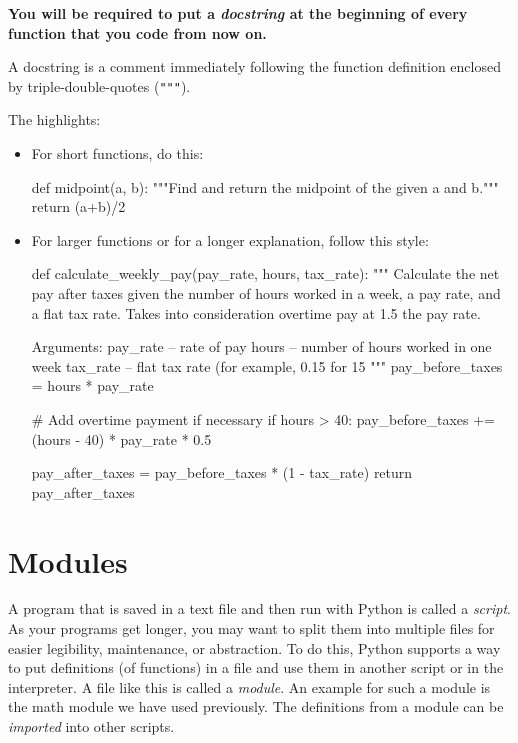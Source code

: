 \documentclass[11pt]{cselabheader}
\begin{document}
{\begin{center}
\bfseries \large You will be required to put a \emph{docstring} at the beginning
of every function that you code from now on.
\end{center}
A docstring is a comment immediately
following the function definition enclosed by triple-double-quotes (\texttt{"""}).

The highlights:
\begin{itemize}
  \item For short functions, do this:

    \begin{python3code}
def midpoint(a, b):
    """Find and return the midpoint of the given a and b."""
    return (a+b)/2
    \end{python3code}

  \item For larger functions or for a longer explanation, follow this style:

    \begin{python3code}
def calculate_weekly_pay(pay_rate, hours, tax_rate):
    """
    Calculate the net pay after taxes given the number of hours worked 
    in a week, a pay rate, and a flat tax rate.
    Takes into consideration overtime pay at 1.5 the pay rate.

    Arguments:
    pay_rate -- rate of pay
    hours -- number of hours worked in one week
    tax_rate -- flat tax rate (for example, 0.15 for 15%
    """
    pay_before_taxes = hours * pay_rate

    # Add overtime payment if necessary
    if hours > 40:
        pay_before_taxes += (hours - 40) * pay_rate * 0.5

    pay_after_taxes = pay_before_taxes * (1 - tax_rate)
    return pay_after_taxes
    \end{python3code}

\end{itemize}

\pagebreak
\section{Modules}
\label{sec:modules}

A program that is saved in a text file and then run with Python is called a
\emph{script}. As your programs get longer, you may want to split them into
multiple files for easier legibility, maintenance, or abstraction. To do this,
Python supports a way to put definitions (of functions) in a file and use them
in another script or in the interpreter. A file like this is called a
\emph{module}. An example for such a module is the math module we have used
previously. The definitions from a module can be \emph{imported} into other
scripts.

}
\end{document}
